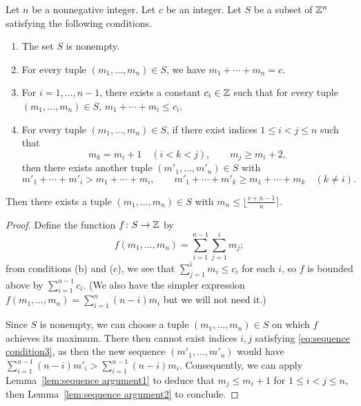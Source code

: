 \begin{lemma} \label{lem:sequence argument3}
\leanok
Let $n$ be a nonnegative integer.
Let $c$ be an integer.
Let $S$ be a subset of $\mathbb{Z}^n$ satisfying the following conditions.
\begin{enumerate}
\item[(a)]
The set $S$ is nonempty.
\item[(b)]
For every tuple $(m_1,\dots,m_n) \in S$, we have $m_1 + \cdots + m_n = c$.
\item[(c)]
For $i=1,\dots,n-1$, there exists a constant $c_i \in \mathbb{Z}$ such that
for every tuple $(m_1,\dots,m_n) \in S$, $m_1 + \cdots + m_i \leq c_i$.
\item[(d)]
For every tuple $(m_1,\dots,m_n) \in S$,
if there exist indices $1 \leq i < j \leq n$ such that
\begin{equation} \label{eq:sequence condition3}
m_k = m_i + 1 \quad (i < k < j), \qquad m_j \geq m_i + 2,
\end{equation}
then there exists another tuple $(m'_1,\dots,m'_n) \in S$ with
\[
m'_1 + \cdots + m'_i > m_1 + \cdots + m_i, \qquad
m'_1 + \cdots + m'_k \geq m_1 + \cdots + m_k \quad (k \neq i).
\]
\end{enumerate}
Then there exists a tuple $(m_1,\dots,m_n) \in S$ with $m_n \leq \lfloor \frac{c+n-1}{n} \rceil$.
\end{lemma}
\begin{proof}
\leanok
{}
Define the function $f\colon S \to \mathbb{Z}$ by
\[
f(m_1,\dots,m_n) = \sum_{i=1}^{n-1} \sum_{j=1}^i m_j;
\]
from conditions (b) and (c), we see that $\sum_{j=1}^i m_i \leq c_i$ for each $i$, so $f$ is bounded above by $\sum_{i=1}^{n-1} c_i$.
(We also have the simpler expression $f(m_1,\dots,m_n) = \sum_{i=1}^n (n-i) m_i$ but we will not need it.)

Since $S$ is nonempty, we can choose a tuple $(m_1,\dots,m_n) \in S$ on which $f$ achieves its maximum.
There then cannot exist indices $i,j$ satisfying \eqref{eq:sequence condition3}, as then the new sequence $(m'_1,\dots,m'_n)$ would have $\sum_{i=1}^{n-1} (n-i)m'_i > \sum_{i=1}^{n-1} (n-i)m_i$.
Consequently, we can apply Lemma~\ref{lem:sequence argument1} to deduce that 
$m_j \leq m_i + 1$ for $1 \leq i < j \leq n$, then Lemma~\ref{lem:sequence argument2} to conclude.
\end{proof}

